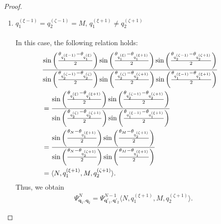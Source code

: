 \documentclass[10pt,a4paper]{amsart}
\begin{document}
\begin{proof}
\begin{enumerate}
\item[\textit{Case.2:}] $q_1^{(\xi-1)} = q_2^{(\zeta-1)} = M$, ${q_1^{(\xi+1)}} \ne {q_2^{(\zeta+1)}}$ \\ \\
In this case, the following relation holds:
%
\begin{align}
    &\frac{\sin\left( \frac{\theta_{q_1^{(\xi-1)}} - \theta_{q_1^{(\xi)}}}{2} \right)\sin\left( \frac{\theta_{q_1^{(\xi)}} - \theta_{q_1^{(\xi+1)}}}{2} \right)\sin\left( \frac{\theta_{q_2^{(\zeta-1)}} - \theta_{q_2^{(\zeta+1)}}}{2} \right)}
   {\sin\left( \frac{\theta_{q_2^{(\zeta-1)}} - \theta_{q_2^{(\zeta)}}}{2} \right)\sin\left( \frac{\theta_{q_2^{(\zeta)}} - \theta_{q_2^{(\zeta+1)}}}{2} \right)\sin\left( \frac{\theta_{q_1^{(\xi-1)}} - \theta_{q_1^{(\xi+1)}}}{2} \right)}\cr
    &=\frac{\sin\left( \frac{\theta_{q_1^{(\xi)}} - \theta_{q_1^{(\xi+1)}}}{2} \right)\sin\left( \frac{\theta_{q_2^{(\zeta-1)}} - \theta_{q_2^{(\zeta+1)}}}{2} \right)}
   {\sin\left( \frac{\theta_{q_2^{(\zeta)}} - \theta_{q_2^{(\zeta+1)}}}{2} \right)\sin\left( \frac{\theta_{q_1^{(\xi-1)}} - \theta_{q_1^{(\xi+1)}}}{2} \right)}\cr
   &=\frac{\sin\left( \frac{\theta_{N} - \theta_{q_1^{(\xi+1)}}}{2} \right)\sin\left( \frac{\theta_{M} - \theta_{q_2^{(\zeta+1)}}}{2} \right)}
   {\sin\left( \frac{\theta_{N} - \theta_{q_2^{(\zeta+1)}}}{2} \right)\sin\left( \frac{\theta_{M} - \theta_{q_1^{(\xi+1)}}}{2} \right)}\cr
   &= \langle N,q_1^{(\xi+1)},M, q_2^{(\zeta+1)}\rangle.
\end{align}
Thus, we obtain
\begin{align}
    \Psi^N_{\bm{q}_1, \bm{q}_2} = \Psi^{N-1}_{\bm{q}'_1, \bm{q}'_2}\langle N,q_1^{(\xi+1)},M, q_2^{(\zeta+1)}\rangle.
\end{align}


\end{enumerate}
\end{proof}
\end{document}
